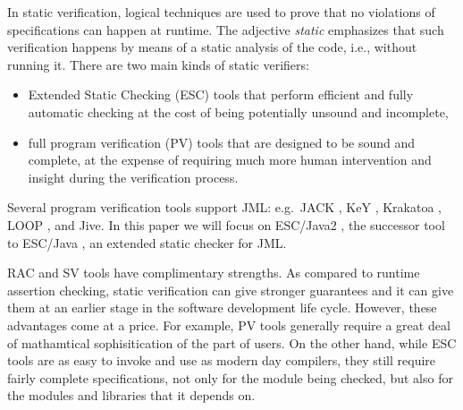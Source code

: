 \documentclass{llncs}
\begin{document}
In static verification,
logical techniques are used to prove that no violations of
specifications can happen at runtime.
The adjective \emph{static\/} emphasizes that such verification
happens by means of a static analysis of the code, i.e., without running it.
%
There are two main kinds of static verifiers:
\begin{itemize}
  \item Extended Static Checking (ESC) tools that perform efficient and fully
    automatic checking at the cost of being potentially unsound and
    incomplete,
  \item full program verification (PV) tools that are designed to be sound and
    complete, at the expense of requiring much more human intervention and
    insight during the verification process.
\end{itemize}
%
Several program verification tools support JML:
e.g.\ JACK \cite{JACK}, KeY \cite{KeY}, Krakatoa \cite{Krakatoa},
LOOP \cite{LOOP}, and Jive. In this paper we will focus
on ESC/Java2 \cite{Cok-Kiniry04},
the successor tool to ESC/Java \cite{Flanagan-Et-Al02},
an extended static checker for JML.

RAC and SV tools have complimentary strengths.
As compared to runtime assertion checking, static verification can give
stronger guarantees and it can give them at an earlier stage in the software
development life cycle. However, these advantages come at a price.
%
For example, PV tools generally require a great deal of mathamtical
sophisitication of the part of users.
%
On the other hand, while ESC tools are as easy to invoke and use as modern day
compilers, they still require fairly complete
specifications, not only for the module being checked, but also for the
modules and libraries that it depends on.

%
%
%
\end{document}
